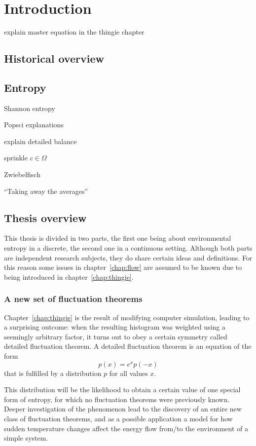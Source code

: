 \chapter{Introduction}

explain master equation in the thingie chapter


\section{Historical overview}

\section{Entropy}

Shannon entropy

Popsci explanations

explain detailed balance

sprinkle \(c\in\Omega\)

Zwiebelfisch


``Taking away the averages''


\section{Thesis overview}

This thesis is divided in two parts, the first one being about environmental entropy in a discrete, the second one in a continuous setting. Although both parts are independent research subjects, they do share certain ideas and definitions. For this reason some issues in chapter~\ref{chap:flow} are assumed to be known due to being introduced in chapter~\ref{chap:thingie}.


\subsection{A new set of fluctuation theorems}

Chapter~\ref{chap:thingie} is the result of modifying computer simulation, leading to a surprising outcome: when the resulting histogram was weighted using a seemingly arbitrary factor, it turns out to obey a certain symmetry called detailed fluctuation theorem. A detailed fluctuation theorem is an equation of the form
%
\begin{equation}
	p(x) = e^{x}p(-x)
\end{equation}
%
that is fulfilled by a distribution \(p\) for all values \(x\).

This distribution will be the likelihood to obtain a certain value of one special form of entropy, for which no fluctuation theorems were previously known. Deeper investigation of the phenomenon lead to the discovery of an entire new class of fluctuation theorems, and as a possible application a model for how sudden temperature changes affect the energy flow from/to the environment of a simple system.





